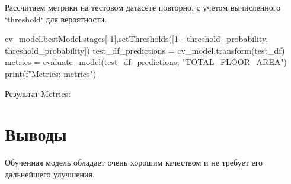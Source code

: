 \par Рассчитаем метрики на тестовом датасете повторно, с учетом вычисленного `threshold` для вероятности.
\begin{code}
cv_model.bestModel.stages[-1].setThresholds([1 - threshold_probability, 
                                             threshold_probability])
test_df_predictions = cv_model.transform(test_df)
metrics = evaluate_model(test_df_predictions, "TOTAL_FLOOR_AREA")
print(f"Metrics: {metrics}")
\end{code}
Результат Metrics: 
\begin{enumerate}
\item 'precision': 0.9164163632014035, 
\item 'recall': 0.6001314226281914, 
\item 'f1': 0.7252923526797572}
\end{enumerate}

\vspace{\baselineskip}\section{Выводы}\vspace{\baselineskip}

\par Обученная модель обладает очень хорошим качеством и не требует его дальнейшего улучшения.
